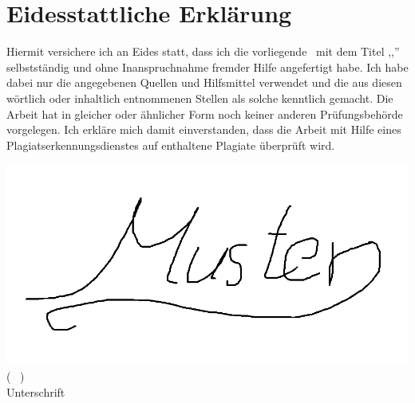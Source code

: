 \chapter{Eidesstattliche Erklärung}

Hiermit versichere ich an Eides statt, dass ich die vorliegende \IUBHTexttype\ mit dem Titel ,,\IUBHTitleDe'' selbstständig und ohne Inanspruchnahme fremder Hilfe angefertigt habe. Ich habe dabei nur die angegebenen Quellen und Hilfsmittel verwendet und die aus diesen wörtlich oder inhaltlich entnommenen Stellen als solche kenntlich gemacht. Die Arbeit hat in gleicher oder ähnlicher Form noch keiner anderen Prüfungsbehörde vorgelegen. Ich erkläre mich damit einverstanden, dass die Arbeit mit Hilfe eines Plagiatserkennungsdienstes auf enthaltene Plagiate überprüft wird.

\vspace{15ex}

	{\includegraphics[width=0.3\linewidth]{src/signature}\\}
	{  }
( \IUBHStudentName\ )\\
Unterschrift